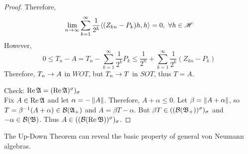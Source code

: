 \begin{proof}
	Therefore,
	\begin{equation*}
		\lim_{n \rightarrow \infty} \sum_{k=1}^{\infty} \frac{1}{2^k} \langle (Z_{kn}-P_k) h,h \rangle = 0,~ \forall h \in \mathscr{H}
	\end{equation*}
	However,
	\begin{equation*}
		0 \leqslant T_n - A = T_n - \sum_{k=1}^{\infty} \frac{1}{2^k} P_k \leqslant \frac{1}{2^n} + \sum_{k=1}^{\infty} \frac{1}{2^k}(Z_{kn}-P_k)
	\end{equation*}
	Therefore, $T_n \rightarrow A$ in $WOT$, but $T_n \rightarrow T$ in $SOT$, thus $T = A$. 
	\item Check: $\operatorname{Re}{\mathfrak{A}} = (\operatorname{Re}{\mathfrak{A}})^{\sigma})_{\sigma}$ \\
	Fix $A \in \operatorname{Re}{\mathfrak{A}}$ and let $\alpha = -\left\lVert A\right\lVert$.  Therefore, $A+\alpha \leqslant 0$. Let $\beta = \left\lVert A+\alpha\right\lVert$, so $T=\beta^{-1}(A+\alpha) \in \mathcal{B}(\mathfrak{A}_+)$ and $A = \beta T -\alpha$. But $\beta T \in ((\mathcal{B}(\mathfrak{B}_+))^{\sigma})_{\sigma}$  and $-\alpha \in \mathcal{B}(\mathfrak{B})$. Thus $A  \in ((\mathcal{B}(\operatorname{Re}{\mathfrak{B}}))^{\sigma})_{\sigma}$.
\end{proof}

The Up-Down Theorem can reveal the basic property of general von Neumann algebras.

